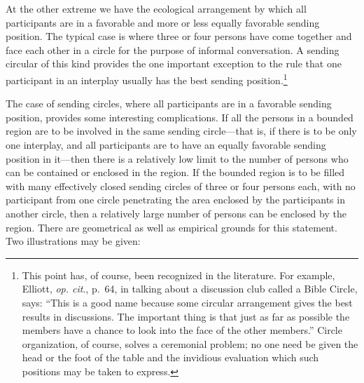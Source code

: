 \documentclass[twoside,symmetric,nobib,justified]{tufte-book}
\begin{document}
At the other extreme we have the ecological arrangement by which all
participants are in a favorable and more or less equally favorable
sending position. The typical case is where three or four persons have
come together and face each other in a circle for the purpose of
informal conversation. A sending circular of this kind provides the one
important exception to the rule that one participant in an interplay
usually has the best sending position.\footnote{This point has, of
  course, been recognized in the literature. For example, Elliott,
  \emph{op. cit}., p.~64, in talking about a discussion club called a
  Bible Circle, says: ``This is a good name because some circular
  arrangement gives the best results in discussions. The important thing
  is that just as far as possible the members have a chance to look into
  the face of the other members.'' Circle organization, of course,
  solves a ceremonial problem; no one need be given the head or the foot
  of the table and the invidious evaluation which such positions may be
  taken to express.}

The case of sending circles, where all participants are in a favorable
sending position, provides some interesting complications. If all the
persons in a bounded region are to be involved in the same sending
circle---that is, if there is to be only one interplay, and all
participants are to have an equally favorable sending position in
it---then there is a relatively low limit to the number of persons who
can be contained or enclosed in the region. If the bounded region is to
be filled with many effectively closed sending circles of three or four
persons each, with no participant from one circle penetrating the area
enclosed by the participants in another circle, then a relatively large
number of persons can be enclosed by the region. There are geometrical
as well as empirical grounds for this statement. Two illustrations may
be given:
\end{document}
